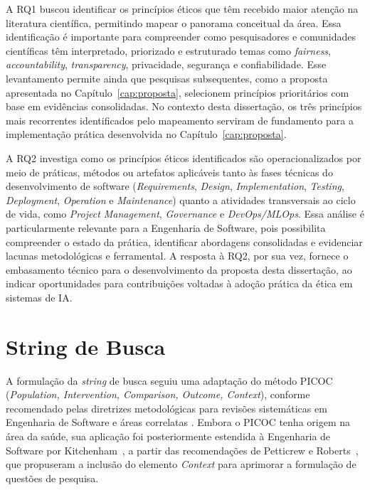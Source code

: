 A RQ1 buscou identificar os princípios éticos que têm recebido maior atenção na literatura científica, permitindo mapear o panorama conceitual da área. Essa identificação é importante para compreender como pesquisadores e comunidades científicas têm interpretado, priorizado e estruturado temas como \textit{fairness}, \textit{accountability}, \textit{transparency}, privacidade, segurança e confiabilidade. Esse levantamento permite ainda que pesquisas subsequentes, como a proposta apresentada no Capítulo~\ref{cap:proposta}, selecionem princípios prioritários com base em evidências consolidadas. No contexto desta dissertação, os três princípios mais recorrentes identificados pelo mapeamento serviram de fundamento para a implementação prática desenvolvida no Capítulo~\ref{cap:proposta}.

A RQ2 investiga como os princípios éticos identificados são operacionalizados por meio de práticas, métodos ou artefatos aplicáveis tanto às fases técnicas do desenvolvimento de software (\textit{Requirements}, \textit{Design}, \textit{Implementation}, \textit{Testing}, \textit{Deployment}, \textit{Operation} e \textit{Maintenance}) quanto a atividades transversais ao ciclo de vida, como \textit{Project Management}, \textit{Governance} e \textit{DevOps/MLOps}. Essa análise é particularmente relevante para a Engenharia de Software, pois possibilita compreender o estado da prática, identificar abordagens consolidadas e evidenciar lacunas metodológicas e ferramental. A resposta à RQ2, por sua vez, fornece o embasamento técnico para o desenvolvimento da proposta desta dissertação, ao indicar oportunidades para contribuições voltadas à adoção prática da ética em sistemas de IA.

\section{String de Busca}

A formulação da \textit{string} de busca seguiu uma adaptação do método PICOC (\textit{Population, Intervention, Comparison, Outcome, Context}), conforme recomendado pelas diretrizes metodológicas para revisões sistemáticas em Engenharia de Software e áreas correlatas \cite{Kitchenham2007, Petticrew2006}. Embora o PICOC tenha origem na área da saúde, sua aplicação foi posteriormente estendida à Engenharia de Software por Kitchenham~\cite{Kitchenham2007}, a partir das recomendações de Petticrew e Roberts~\cite{Petticrew2006}, que propuseram a inclusão do elemento \textit{Context} para aprimorar a formulação de questões de pesquisa.

